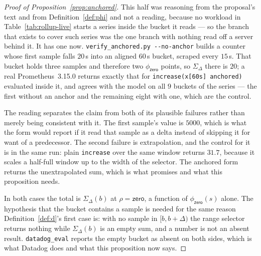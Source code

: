 \begin{proof}[Proof of Proposition~\ref{prop:anchored}]
This half was reasoning from the proposal's text and from Definition~\ref{def:phi} and
not a reading, because no workload in Table~\ref{tab:rollup-live} starts a series inside
the bucket it reads --- so the branch that exists to cover such series was the one branch
with nothing read off a server behind it. It has one now.
\texttt{verify\_anchored.py~-\/-no-anchor} builds a counter whose first sample falls
$20$\,s into an aligned $60$\,s bucket, scraped every $15$\,s. That bucket holds three
samples and therefore two $\phi_{\mathsf{zero}}$ points, so $\Sigma_\Delta$ there is
$20$; a real Prometheus~3.15.0 returns exactly that for
\texttt{increase(x[60s] anchored)} evaluated inside it, and agrees with the model on all
$9$ buckets of the series --- the first without an anchor and the remaining eight with
one, which are the control.

The reading separates the claim from both of its plausible failures rather than merely
being consistent with it. The first sample's value is $5000$, which is what the form
would report if it read that sample as a delta instead of skipping it for want of a
predecessor. The second failure is extrapolation, and the control for it is in the same
run: plain \texttt{increase} over the same window returns $31.7$, because it scales a
half-full window up to the width of the selector. The anchored form returns the
unextrapolated sum, which is what \citet{prom0052} promises and what this proposition
needs.

In both cases the total is $\Sigma_\Delta(b)$ at $\rho=\mathsf{zero}$, a function of
$\phi_{\mathsf{zero}}(s)$ alone. The hypothesis that the bucket contains a sample is
needed for the same reason Definition~\ref{def:d}'s first case is: with no sample in
$[b,b+\Delta)$ the range selector returns nothing while $\Sigma_\Delta(b)$ is an empty
sum, and a number is not an absent result. \texttt{datadog\_eval} reports the empty
bucket as absent on both sides, which is what Datadog does and what this proposition now
says.
\end{proof}

